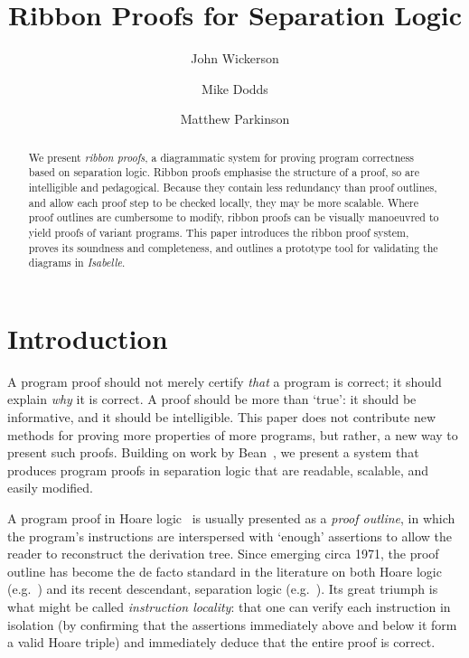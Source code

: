 \documentclass[runningheads,a4paper]{llncs}
\title{Ribbon Proofs for Separation Logic }
\author{John Wickerson\inst{1} \and Mike Dodds\inst{2} \and Matthew Parkinson\inst{3}}
\institute{Technische Universität Berlin, Germany \and University of York, United Kingdom \and Microsoft Research Cambridge, United Kingdom}
\begin{document}
\maketitle

\setcounter{footnote}{0}

\begin{abstract}
We present \emph{ribbon proofs}, a diagrammatic system for proving program correctness based on separation logic. Ribbon proofs emphasise the structure of a proof, so are intelligible and pedagogical. Because they contain less redundancy than proof outlines, and allow each proof step to be checked locally, they may be more scalable. Where proof outlines are cumbersome to modify, ribbon proofs can be visually manoeuvred to yield proofs of variant programs. This paper introduces the ribbon proof system, proves its soundness and completeness, and outlines a prototype tool for validating the diagrams in \emph{Isabelle}.
\end{abstract}

\section{Introduction}

A program proof should not merely certify \emph{that} a program is correct; it should explain \emph{why} it is correct. A proof should be more than `true': it should be informative, and it should be intelligible. This paper does not contribute new methods for proving more properties of more programs, but rather, a new way to present such proofs. Building on work by Bean~\cite{bean06}, we present a system that produces program proofs in separation logic that are readable, scalable, and easily modified.

A program proof in Hoare logic~\cite{hoare69} is usually presented as a \emph{proof outline}, in which the program's instructions are interspersed with `enough' assertions to allow the reader to reconstruct the derivation tree. Since emerging circa 1971, the proof outline has become the de facto standard in the literature on both Hoare logic (e.g.~\cite{ashcroft76,hoare71,owicki+76,schneider97}) and its recent descendant, separation logic (e.g.~\cite{bornat+05,dinsdale-young+10-b,dodds+09,feng09,feng+07-a,gotsman+07,hur+11,ishtiaq+01,jacobs+11,reynolds02,vafeiadis+07%
}). Its great triumph is what might be called \emph{instruction locality}: that one can verify each instruction in isolation (by confirming that the assertions immediately above and below it form a valid Hoare triple) and immediately deduce that the entire proof is correct. 
\end{document}
